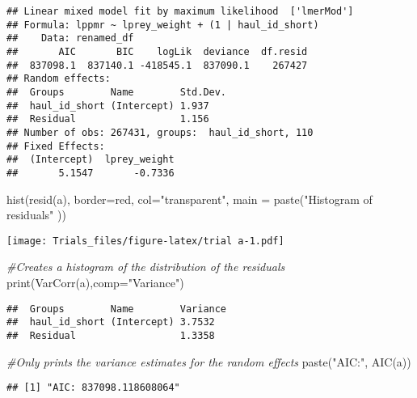 \documentclass[
]{article}
\newenvironment{Shaded}{\begin{snugshade}}{\end{snugshade}}
\newcommand{\AttributeTok}[1]{\textcolor[rgb]{0.77,0.63,0.00}{#1}}
\newcommand{\CommentTok}[1]{\textcolor[rgb]{0.56,0.35,0.01}{\textit{#1}}}
\newcommand{\FunctionTok}[1]{\textcolor[rgb]{0.00,0.00,0.00}{#1}}
\newcommand{\NormalTok}[1]{#1}
\newcommand{\StringTok}[1]{\textcolor[rgb]{0.31,0.60,0.02}{#1}}
\begin{document}
\begin{verbatim}
## Linear mixed model fit by maximum likelihood  ['lmerMod']
## Formula: lppmr ~ lprey_weight + (1 | haul_id_short)
##    Data: renamed_df
##       AIC       BIC    logLik  deviance  df.resid 
##  837098.1  837140.1 -418545.1  837090.1    267427 
## Random effects:
##  Groups        Name        Std.Dev.
##  haul_id_short (Intercept) 1.937   
##  Residual                  1.156   
## Number of obs: 267431, groups:  haul_id_short, 110
## Fixed Effects:
##  (Intercept)  lprey_weight  
##       5.1547       -0.7336
\end{verbatim}

\begin{Shaded}
\begin{Highlighting}[]
\FunctionTok{hist}\NormalTok{(}\FunctionTok{resid}\NormalTok{(a), }\AttributeTok{border=}\StringTok{\textquotesingle{}red\textquotesingle{}}\NormalTok{, }\AttributeTok{col=}\StringTok{"transparent"}\NormalTok{, }\AttributeTok{main =} \FunctionTok{paste}\NormalTok{(}\StringTok{"Histogram of residuals"}\NormalTok{ ))}
\end{Highlighting}
\end{Shaded}

\texttt{[image: Trials\_files/figure-latex/trial a-1.pdf]}

\begin{Shaded}
\begin{Highlighting}[]
\CommentTok{\#Creates a histogram of the distribution of the residuals}
\FunctionTok{print}\NormalTok{(}\FunctionTok{VarCorr}\NormalTok{(a),}\AttributeTok{comp=}\StringTok{"Variance"}\NormalTok{)}
\end{Highlighting}
\end{Shaded}

\begin{verbatim}
##  Groups        Name        Variance
##  haul_id_short (Intercept) 3.7532  
##  Residual                  1.3358
\end{verbatim}

\begin{Shaded}
\begin{Highlighting}[]
\CommentTok{\#Only prints the variance estimates for the random effects}
\FunctionTok{paste}\NormalTok{(}\StringTok{"AIC:"}\NormalTok{, }\FunctionTok{AIC}\NormalTok{(a))}
\end{Highlighting}
\end{Shaded}

\begin{verbatim}
## [1] "AIC: 837098.118608064"
\end{verbatim}
\end{document}
